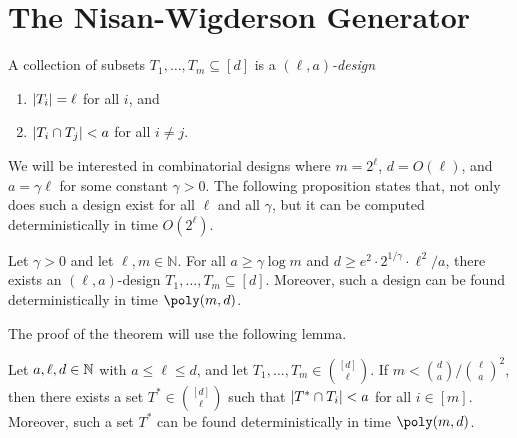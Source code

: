 \section{The Nisan-Wigderson Generator}

\begin{definition}
  A collection of subsets $T_1, \dots, T_m \subseteq [d]$ is a \emph{$(\ell, a)$-design}
	\begin{enumerate}
    \item $\lvert T_i\rvert = \ell$ for all $i$, and
		\item $\lvert T_i \cap T_j\rvert < a$ for all $i \ne j$.
	\end{enumerate}
\end{definition}

We will be interested in combinatorial designs where $m = 2^\ell$, $d =
O(\ell)$, and $a = \gamma \ell$ for some constant $\gamma > 0$. The following
proposition states that, not only does such a design exist for all $\ell$ and
all $\gamma$, but it can be computed deterministically in time $O(2^\ell)$.

\begin{theorem}\label{thm:design}
  Let $\gamma > 0 $ and let $\ell, m \in \mathbb{N}$. For all $a \ge \gamma
  \log{m}$ and $d \ge e^2 \cdot 2^{1/\gamma} \cdot \ell^2/a$, there exists an
  $(\ell, a)$-design $T_1, \dots, T_m \subseteq [d]$. Moreover, such a design
  can be found deterministically in time $\poly(m, d)$.
\end{theorem}

The proof of the theorem will use the following lemma.
\begin{lemma}\label{lem:design}
  Let $a, \ell, d \in \mathbb{N}$ with $a \le \ell \le d$, and let $T_1, \dots, T_m \in
  \binom{[d]}{\ell}$. If $m < \binom{d}{a} / \binom{\ell}{a}^2$, then there
  exists a set $T^* \in \binom{[d]}{\ell}$ such that $\lvert T^* \cap T_i\rvert < a$
  for all $i \in [m]$. Moreover, such a set $T^*$ can be found
  deterministically in time $\poly(m, d)$.
\end{lemma}

